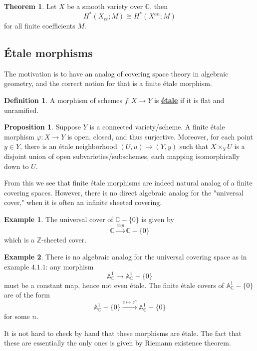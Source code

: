 \documentclass{article}
\theoremstyle{definition}
\newtheorem{theorem}{Theorem}[section]
\theoremstyle{definition}
\newtheorem{definition}{Definition}[theorem]
\theoremstyle{definition}
\theoremstyle{definition}
\newtheorem{proposition}{Proposition}[theorem]
\theoremstyle{definition}
\theoremstyle{definition}
\theoremstyle{definition}
\newtheorem{example}{Example}[theorem]
\begin{document}
\begin{tcolorbox}[colback=red!5!white,colframe=red!30!white]
\begin{theorem}
Let $X$ be a smooth variety over $\mathbb{C}$, then
\[H^*(X_{et}; M)\cong H^*(X^{an};M)\]
for all finite coefficients $M$.
\end{theorem}
\end{tcolorbox}

\subsection{\'Etale morphisms}
The motivation is to have an analog of covering space theory in algebraic geometry, and the correct notion for that is a finite \'etale morphism.


\begin{tcolorbox}[colback=purple!5!white,colframe=purple!75!black]
\begin{definition}
A morphism of schemes $f: X\to Y$ is \underline{\textbf{\'etale}} if it is flat and unramified.
\end{definition}
\end{tcolorbox}


\begin{tcolorbox}[colback=blue!5!white,colframe=blue!30!white]
\begin{proposition}
Suppose $Y$ is a connected variety/scheme. A finite \'etale morphism $\varphi: X\to Y$ is open, closed, and thus surjective. Moreover, for each point $y\in Y$, there is an \'etale neighborhood $(U,u)\to (Y,y)$ such that $X\times_Y U$ is a disjoint union of open subvarieties/subschemes, each mapping isomorphically down to $U$.
\end{proposition}
\end{tcolorbox}
From this we see that finite \'etale morphisms are indeed natural analog of a finite covering spaces. However, there is no direct algebraic analog for the "universal cover," when it is often an infinite sheeted covering.
\begin{tcolorbox}[colback=yellow!5!white,colframe=yellow!30!white]
\begin{example}
The universal cover of $\mathbb{C}-\{0\}$ is given by 
\[\mathbb{C}\xrightarrow{exp} \mathbb{C}-\{0\}\]
which is a $\mathbb{Z}$-sheeted cover.  
\end{example}
\end{tcolorbox}


\begin{tcolorbox}[colback=yellow!5!white,colframe=yellow!30!white]
\begin{example}
There is no algebraic analog for the universal covering space as in example $4.1.1$: any morphism 
\[\mathbb{A}^1_{\mathbb{C}}\to \mathbb{A}^1_{\mathbb{C}}-\{0\}\]
must be a constant map, hence not even \'etale. The finite \'etale covers of $\mathbb{A}^1_{\mathbb{C}}-\{0\}$ are of the form 
\[\mathbb{A}^1_{\mathbb{C}}-\{0\}\xrightarrow{z\mapsto z^n}\mathbb{A}^1_{\mathbb{C}}-\{0\}\]
for some $n$. 
\end{example}
\end{tcolorbox}
It is not hard to check by hand that these morphisms are \'etale. The fact that these are essentially the only ones is given by Riemann existence theorem.
\end{document}
